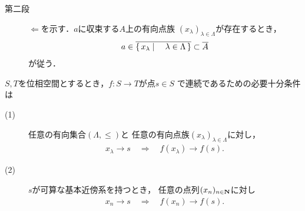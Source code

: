 \begin{prf}
\begin{description}
			\item[第二段] $\Longleftarrow$を示す．$a$に収束する$A$上の有向点族
				$(x_\lambda)_{\lambda \in \Lambda}$が存在するとき，
				\begin{align}
					a \in \overline{\left\{\, x_\lambda \mid \quad \lambda \in \Lambda\, \right\}} 
					\subset \overline{A}
				\end{align}
				が従う．
				\QED
		\end{description}
	\end{prf}
	
	\begin{screen}
		\begin{thm}\label{thm:continuity_and_net}
			$S,T$を位相空間とするとき，$f:S \longrightarrow T$が点$s \in S$
			で連続であるための必要十分条件は
			\begin{description}
				\item[(1)] 任意の有向集合$(\Lambda,\leq)$と
					任意の有向点族$(x_\lambda)_{\lambda \in \Lambda}$に対し，
					\begin{align}
						x_\lambda \longrightarrow s \quad \Longrightarrow \quad
						f(x_\lambda) \longrightarrow f(s).
					\end{align}
					
				\item[(2)] $s$が可算な基本近傍系を持つとき，
					任意の点列$(x_n)_{n \in \mathbf{N}}$に対し
					\begin{align}
						x_n \longrightarrow s \quad \Longrightarrow \quad
						f(x_n) \longrightarrow f(s).
					\end{align}
			\end{description}
		\end{thm}
	\end{screen}
	
